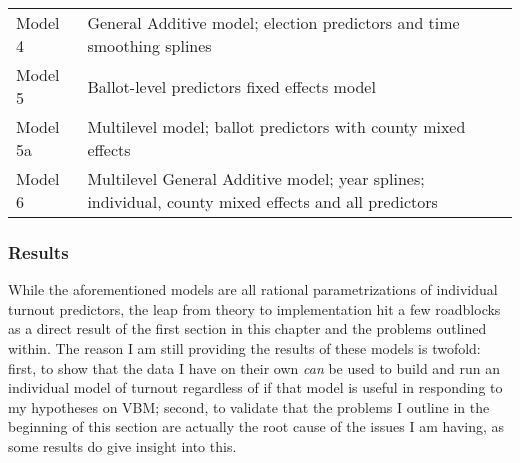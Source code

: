 \documentclass[]{article}
\begin{document}
\begin{longtable}[]{@{}ll@{}}
\begin{minipage}[t]{0.15\columnwidth}
Model 4\strut
\end{minipage} & \begin{minipage}[t]{0.80\columnwidth}\raggedright\strut
General Additive model; election predictors and time smoothing
splines\strut
\end{minipage}\tabularnewline
\begin{minipage}[t]{0.15\columnwidth}\raggedright\strut
Model 5\strut
\end{minipage} & \begin{minipage}[t]{0.80\columnwidth}\raggedright\strut
Ballot-level predictors fixed effects model\strut
\end{minipage}\tabularnewline
\begin{minipage}[t]{0.15\columnwidth}\raggedright\strut
Model 5a\strut
\end{minipage} & \begin{minipage}[t]{0.80\columnwidth}\raggedright\strut
Multilevel model; ballot predictors with county mixed effects\strut
\end{minipage}\tabularnewline
\begin{minipage}[t]{0.15\columnwidth}\raggedright\strut
Model 6\strut
\end{minipage} & \begin{minipage}[t]{0.80\columnwidth}\raggedright\strut
Multilevel General Additive model; year splines; individual, county
mixed effects and all predictors\strut
\end{minipage}\tabularnewline
\bottomrule
\end{longtable}

\subsubsection{Results}\label{results-1}

While the aforementioned models are all rational parametrizations of
individual turnout predictors, the leap from theory to implementation
hit a few roadblocks as a direct result of the first section in this
chapter and the problems outlined within. The reason I am still
providing the results of these models is twofold: first, to show that
the data I have on their own \emph{can} be used to build and run an
individual model of turnout regardless of if that model is useful in
responding to my hypotheses on VBM; second, to validate that the
problems I outline in the beginning of this section are actually the
root cause of the issues I am having, as some results do give insight
into this.
\end{document}

